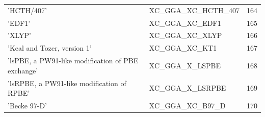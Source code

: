\documentclass[final,12pt,makeidx,DIV=calc]{article}
\begin{document}
{{{\begin{table}[!h]
\begin{center}
\begin{tabular}{llr}
  'HCTH/407' & XC\_GGA\_XC\_HCTH\_407  &164\\
  'EDF1' & XC\_GGA\_XC\_EDF1  &165\\
  'XLYP' & XC\_GGA\_XC\_XLYP  &166\\
  'Keal and Tozer, version 1' & XC\_GGA\_XC\_KT1  &167\\
  'lsPBE, a PW91-like modification of PBE exchange' & XC\_GGA\_X\_LSPBE  &168\\
  'lsRPBE, a PW91-like modification of RPBE' & XC\_GGA\_X\_LSRPBE  &169\\
  'Becke 97-D' & XC\_GGA\_XC\_B97\_D  &170\\
\hline
\hline
\end{tabular}
\end{center}
\end{table}

}}}
\end{document}
